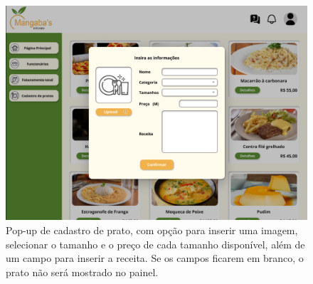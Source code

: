 \begin{center}
\begin{figure}[!htp]
        \includegraphics[width=1\textwidth]{imagens-template/Layout_Gerente_2647.png} 
        \caption{Pop-up de cadastro de prato, com opção para inserir uma imagem, selecionar o tamanho e o preço de cada tamanho disponível, além de um campo para inserir a receita. Se os campos ficarem em branco, o prato não será mostrado no painel.}
    \end{figure}
    \newpage
\end{center}

